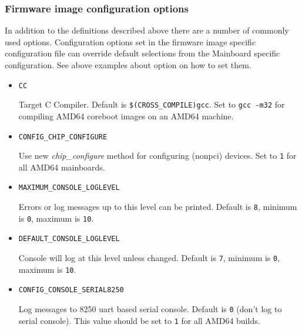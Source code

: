\documentclass[titlepage,12pt]{article}
\begin{document}
\subsubsection{Firmware image configuration options}
In addition to the definitions described above there are a number of
commonly used options. Configuration options set in the firmware image
specific configuration file can override default selections from the
Mainboard specific configuration.  See above examples about
option on how to set them.

\begin{itemize}

\item \begin{verbatim}CC\end{verbatim}

Target C Compiler. Default is \texttt{\$(CROSS\_COMPILE)gcc}. Set to
\texttt{gcc -m32} for compiling AMD64 coreboot images on an AMD64 
machine.

\item \begin{verbatim}CONFIG_CHIP_CONFIGURE \end{verbatim}

Use new \textit{chip\_configure} method for configuring (nonpci)
devices. Set to \texttt{1} for all AMD64 mainboards.

\item \begin{verbatim}MAXIMUM_CONSOLE_LOGLEVEL\end{verbatim}

Errors or log messages up to this level can be printed. Default is
\texttt{8}, minimum is \texttt{0}, maximum is \texttt{10}.

\item \begin{verbatim}DEFAULT_CONSOLE_LOGLEVEL\end{verbatim}

Console will log at this level unless changed. Default is \texttt{7}, 
minimum is \texttt{0}, maximum is \texttt{10}.

\item \begin{verbatim}CONFIG_CONSOLE_SERIAL8250\end{verbatim}

Log messages to 8250 uart based serial console. Default is \texttt{0}
(don't log to serial console). This value should be set to \texttt{1}
for all AMD64 builds.


\end{itemize}
\end{document}
